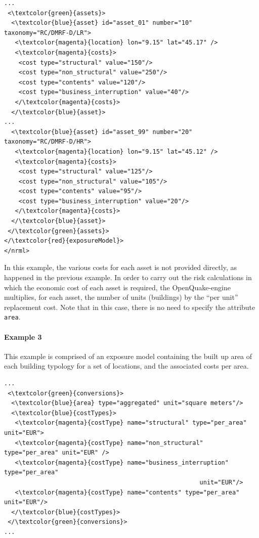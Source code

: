 \begin{Verbatim}[frame=single, commandchars=\\\{\}, samepage=false]
...
 <\textcolor{green}{assets}>
  <\textcolor{blue}{asset} id="asset_01" number="10" taxonomy="RC/DMRF-D/LR">
   <\textcolor{magenta}{location} lon="9.15" lat="45.17" />
   <\textcolor{magenta}{costs}>
    <cost type="structural" value="150"/>
    <cost type="non_structural" value="250"/>
    <cost type="contents" value="120"/>
    <cost type="business_interruption" value="40"/>
   </\textcolor{magenta}{costs}>
  </\textcolor{blue}{asset}>
...
  <\textcolor{blue}{asset} id="asset_99" number="20" taxonomy="RC/DMRF-D/HR">
   <\textcolor{magenta}{location} lon="9.15" lat="45.12" />
   <\textcolor{magenta}{costs}>
    <cost type="structural" value="125"/>
    <cost type="non_structural" value="105"/>
    <cost type="contents" value="95"/>
    <cost type="business_interruption" value="20"/>
   </\textcolor{magenta}{costs}>
  </\textcolor{blue}{asset}>
 </\textcolor{green}{assets}>
</\textcolor{red}{exposureModel}>
</nrml>
\end{Verbatim}

In this example, the various costs for each asset is not provided directly, as happened in the previous example. In order to carry out the risk calculations in which the economic cost of each asset is required, the OpenQuake-engine multiplies, for each asset, the number of units (buildings) by the ``per unit'' replacement cost. Note that in this case, there is no need to specify the attribute \Verb+area+.

\paragraph{Example 3}
This example is comprised of an \gls{exposure model} containing the built up area of each building typology for a set of locations, and the associated costs per area.

\begin{Verbatim}[frame=single, commandchars=\\\{\}, samepage=false]
...
 <\textcolor{green}{conversions}>
  <\textcolor{blue}{area} type="aggregated" unit="square meters"/>
  <\textcolor{blue}{costTypes}>
   <\textcolor{magenta}{costType} name="structural" type="per_area" unit="EUR">
   <\textcolor{magenta}{costType} name="non_structural" type="per_area" unit="EUR" />
   <\textcolor{magenta}{costType} name="business_interruption" type="per_area" 
                                                      unit="EUR"/>
   <\textcolor{magenta}{costType} name="contents" type="per_area" unit="EUR"/>
  </\textcolor{blue}{costTypes}>
 </\textcolor{green}{conversions}>
...
\end{Verbatim}

